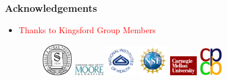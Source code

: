 \documentclass[12pt]{beamer}
\begin{document}


\begin{frame}
\frametitle{Acknowledgements}

\vspace{0.8cm}

\begin{itemize}
\item\textcolor{red}{Thanks to Kingsford Group Members}

\vfill

\begin{figure}
\includegraphics[width=1.3cm]{sloan.jpg} 
\hfill
\includegraphics[width=1.3cm]{moorelogo.png} 
\hfill
\includegraphics[width=1.3cm]{nih.png}
\hfill
\includegraphics[width=1.3cm]{nsf.png}
\hfill
\includegraphics[width=1.2cm]{cmulogo.jpeg} 
\hfill
\includegraphics[width=1.0cm]{cpcblogo.jpeg}
\end{figure}
\vfill

\end{itemize}

\end{frame}
\end{document}
